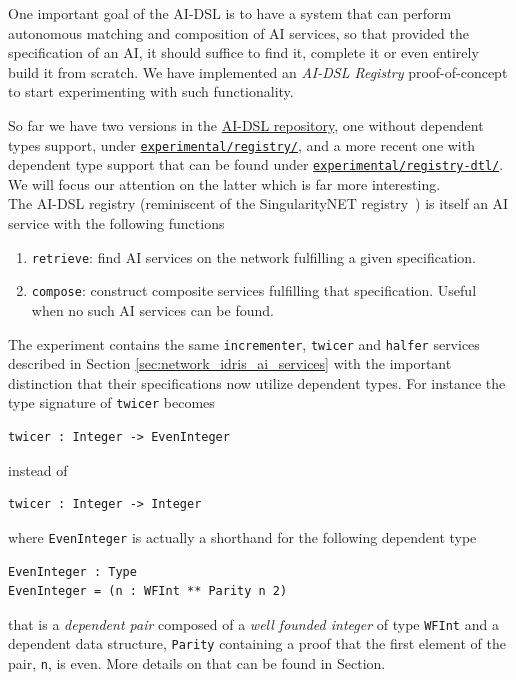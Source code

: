 \documentclass[]{report}
\newcommand{\nil}[2][]{\todo[color=purple,author=nil, #1]{#2}}
\begin{document}
One important goal of the AI-DSL is to have a system that can perform
autonomous matching and composition of AI services, so that provided
the specification of an AI, it should suffice to find it, complete it
or even entirely build it from scratch.  We have implemented an
\emph{AI-DSL Registry} proof-of-concept to start experimenting with
such functionality.

So far we have two versions in the
\href{https://github.com/singnet/ai-dsl/}{AI-DSL repository}, one
without dependent types support, under
\href{https://github.com/singnet/ai-dsl/blob/master/experimental/registry/}{\texttt{experimental/registry/}},
and a more recent one with dependent type support that can be found
under
\href{https://github.com/singnet/ai-dsl/blob/master/experimental/registry-dtl/}{\texttt{experimental/registry-dtl/}}.
We will focus our attention on the latter which is far more
interesting.\\

The AI-DSL registry (reminiscent of the SingularityNET
registry~\cite{SNETRegistry}) is itself an AI service with the following functions
\begin{enumerate}
\item \texttt{retrieve}: find AI services on the network fulfilling a
  given specification.
\item \texttt{compose}: construct composite services fulfilling that
  specification.  Useful when no such AI services can be found.
\end{enumerate}

The experiment contains the same \texttt{incrementer}, \texttt{twicer}
and \texttt{halfer} services described in Section
\ref{sec:network_idris_ai_services} with the important distinction that
their specifications now utilize dependent types.  For instance the
type signature of \texttt{twicer} becomes
\begin{verbatim}
twicer : Integer -> EvenInteger
\end{verbatim}
instead of
\begin{verbatim}
twicer : Integer -> Integer
\end{verbatim}
where \texttt{EvenInteger} is actually a shorthand for the following
dependent type
\begin{verbatim}
EvenInteger : Type
EvenInteger = (n : WFInt ** Parity n 2)
\end{verbatim}
that is a \emph{dependent pair} composed of a \emph{well founded
integer} of type \texttt{WFInt} and a dependent data structure,
\texttt{Parity} containing a proof that the first element of the pair,
\texttt{n}, is even.  More details on that can be found in
Section\nil{Add ref to Sam's work}.
\end{document}
